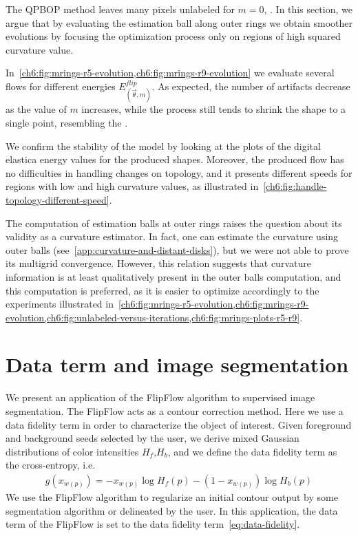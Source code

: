 The QPBOP method leaves many pixels unlabeled for $m=0$, . In this section, we argue that by evaluating the estimation ball along outer rings we obtain smoother evolutions by focusing the optimization process only on regions of high squared curvature value.

In~\cref{ch6:fig:mrings-r5-evolution,ch6:fig:mrings-r9-evolution} we evaluate several flows for different energies $E_{(\vec{\theta},m)}^{flip}$. As expected, the number of artifacts decrease as the value of $m$ increases, while the process still tends to shrink the shape to a single point, resembling the . 

We confirm the stability of the model by looking at the plots of the digital elastica energy values for the produced shapes. Moreover, the produced flow has no difficulties in handling changes on topology, and it presents different speeds for regions with low and high curvature values, as illustrated in~\cref{ch6:fig:handle-topology-different-speed}.

The computation of estimation balls at outer rings raises the question about its validity as a curvature estimator. In fact, one can estimate the curvature using outer balls (see~\cref{app:curvature-and-distant-disks}), but we were not able to prove its multigrid convergence. However, this relation suggests that curvature information is at least qualitatively present in the outer balls computation, and this computation is preferred, as it is easier to optimize accordingly to the experiments illustrated in~\cref{ch6:fig:mrings-r5-evolution,ch6:fig:mrings-r9-evolution,ch6:fig:unlabeled-versus-iterations,ch6:fig:mrings-plots-r5-r9}.




\section{Data term and image segmentation}
\label{ch6:sec:data-term-image-segmentation}

We present an application of the FlipFlow algorithm to supervised image segmentation. The FlipFlow acts as a contour correction method. Here we use a data fidelity term in order to characterize the object of interest. Given foreground and background seeds selected by the user, we derive mixed Gaussian distributions of color intensities $H_f$,$H_b$, and we define the data fidelity term as the cross-entropy, i.e.
\begin{align}
  g(x_{w(p)}) = -x_{w(p)}\log{H_f(p)} - (1-x_{w(p)})\log{H_b(p)}
  \label{eq:data-fidelity}
\end{align}	
%
We use the FlipFlow algorithm to regularize an initial contour output by some segmentation algorithm or delineated by the user. In this application, the data term of the FlipFlow
is set to the data fidelity term~\cref{eq:data-fidelity}.
	
